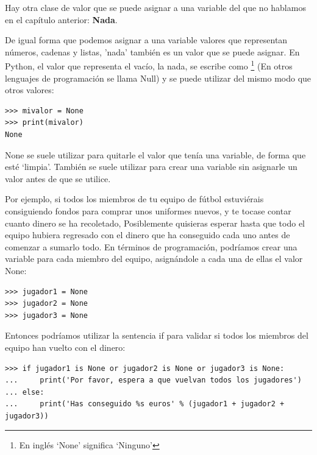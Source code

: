 Hay otra clase de valor que se puede asignar a una variable del que no hablamos en el capítulo anterior:  \textbf{Nada}.
\par
De igual forma que podemos asignar a una variable valores que representan números, cadenas y listas, 'nada' también es un valor que se puede asignar.  En Python, el valor que representa el vacío, la nada, se escribe como \footnote{En inglés `None' significa `Ninguno'} (En otros lenguajes de programación se llama Null) y se puede utilizar del mismo modo que otros valores:

\begin{listing}
\begin{verbatim}
>>> mivalor = None
>>> print(mivalor)
None
\end{verbatim}
\end{listing}

None se suele utilizar para quitarle el valor que tenía una variable, de forma que esté `limpia'. También se suele utilizar para crear una variable sin asignarle un valor antes de que se utilice.
\par
Por ejemplo, si todos los miembros de tu equipo de fútbol estuviérais consiguiendo fondos para comprar unos uniformes nuevos, y te tocase contar cuanto dinero se ha recoletado, Posiblemente quisieras esperar hasta que todo el equipo hubiera regresado con el dinero que ha conseguido cada uno antes de comenzar a sumarlo todo.  En términos de programación, podríamos crear una variable para cada miembro del equipo, asignándole a cada una de ellas el valor None:

\begin{listing}
\begin{verbatim}
>>> jugador1 = None
>>> jugador2 = None
>>> jugador3 = None
\end{verbatim}
\end{listing}

Entonces podríamos utilizar la sentencia if para validar si todos los miembros del equipo han vuelto con el dinero:

\begin{listing}
\begin{verbatim}
>>> if jugador1 is None or jugador2 is None or jugador3 is None:
...     print('Por favor, espera a que vuelvan todos los jugadores')
... else:
...     print('Has conseguido %s euros' % (jugador1 + jugador2 + jugador3))
\end{verbatim}
\end{listing}

